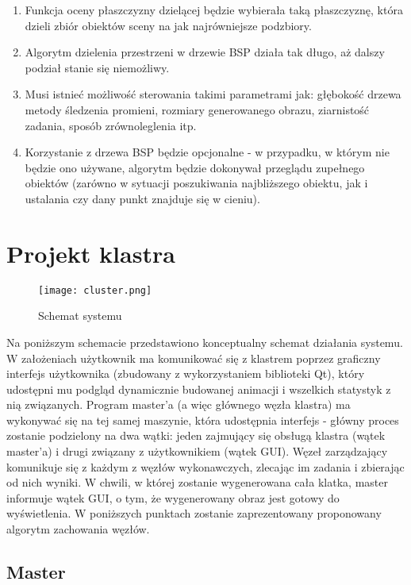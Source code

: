 \begin{enumerate}
	\item Funkcja oceny płaszczyzny dzielącej będzie wybierała taką płaszczyznę, która dzieli zbiór obiektów sceny na jak najrówniejsze podzbiory.
	\item Algorytm dzielenia przestrzeni w drzewie BSP działa tak długo, aż dalszy podział stanie się niemożliwy.
	\item Musi istnieć możliwość sterowania takimi parametrami jak: głębokość drzewa metody śledzenia promieni, rozmiary generowanego obrazu, ziarnistość zadania, sposób zrównoleglenia itp.
	\item Korzystanie z drzewa BSP będzie opcjonalne - w przypadku, w którym nie będzie ono używane, algorytm będzie dokonywał przeglądu zupełnego obiektów (zarówno w sytuacji poszukiwania najbliższego obiektu, jak i ustalania czy dany punkt znajduje się w cieniu).

\end{enumerate}

\section{Projekt klastra}

\begin{figure}[H]
\centering
  \texttt{[image: cluster.png]}
    \caption{Schemat systemu}
\end{figure}

Na poniższym schemacie przedstawiono konceptualny schemat działania systemu. W założeniach użytkownik ma komunikować się z klastrem poprzez graficzny interfejs użytkownika (zbudowany z wykorzystaniem biblioteki Qt), który udostępni mu podgląd dynamicznie budowanej animacji i wszelkich statystyk z nią związanych. Program master'a (a więc głównego węzła klastra) ma wykonywać się na tej samej maszynie, która udostępnia interfejs - główny proces zostanie podzielony na dwa wątki: jeden zajmujący się obsługą klastra (wątek master'a) i drugi związany z użytkownikiem (wątek GUI). Węzeł zarządzający komunikuje się z każdym z węzłów wykonawczych, zlecając im zadania i zbierając od nich wyniki. W chwili, w której zostanie wygenerowana cała klatka, master informuje wątek GUI, o tym, że wygenerowany obraz jest gotowy do wyświetlenia. W poniższych punktach zostanie zaprezentowany proponowany algorytm zachowania węzłów.  
	
\subsection{Master}

